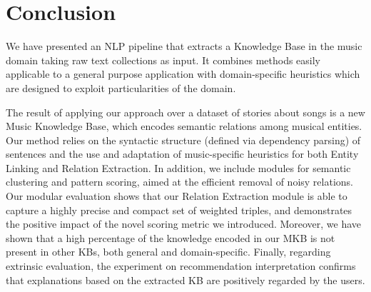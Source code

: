 \section{Conclusion}\label{sec:kb:conclusions}

We have presented an NLP pipeline that extracts a Knowledge Base in the music domain taking raw text collections as input. It combines methods easily applicable to a general purpose application with domain-specific heuristics which are designed to exploit particularities of the domain.

The result of applying our approach over a dataset of stories about songs is a new Music Knowledge Base, which encodes semantic relations among musical entities. Our method relies on the syntactic structure (defined via dependency parsing) of sentences and the use and adaptation of music-specific heuristics for both Entity Linking and Relation Extraction. In addition, we include modules for semantic clustering and pattern scoring, aimed at the efficient removal of noisy relations. Our modular evaluation shows that our Relation Extraction module is able to capture a highly precise and compact set of weighted triples, and demonstrates the positive impact of the novel scoring metric we introduced. Moreover, we have shown that a high percentage of the knowledge encoded in our MKB is not present in other KBs, both general and domain-specific. Finally, regarding extrinsic evaluation, the experiment on recommendation interpretation confirms that explanations based on the extracted KB are positively regarded by the users.


